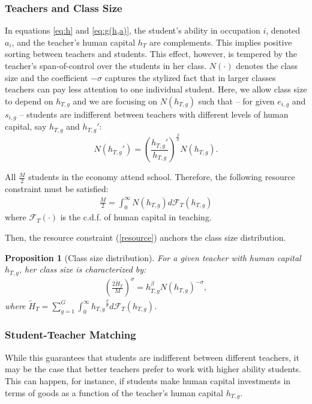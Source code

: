 \documentclass[onehalfspacing,11pt]{article}
\newtheorem{prp}{Proposition}
\begin{document}

\subsubsection{Teachers and Class Size}
In equations \eqref{eq:h} and \eqref{eq:g(h,a)}, the student's ability in occupation $i$, denoted $a_i$, and the teacher's human capital $h_T$ are complements. This implies positive sorting between teachers and students. This effect, however, is tempered by the teacher's span-of-control over the students in her class. $N(\cdot)$ denotes the class size and the coefficient $-\sigma$ captures the stylized fact that in larger classes teachers can pay less attention to one individual student. Here, we allow class size to depend on $h_{T,g}$ and we are focusing on $N(h_{T,g})$ such that -- for given $e_{i,g}$ and $s_{i,g}$ -- students are indifferent between teachers with different levels of human capital, say $h_{T,g}$ and ${h_{T,g}}'$:
 \begin{equation}
\label{ }
N({h_{T,g}}') = \left(\frac{{h_{T,g}}'}{{h_{T,g}}}\right)^{\frac{\beta}{\sigma}} N({h_{T,g}}).
\end{equation}

All $\frac{M}{2}$ students in the economy attend school. Therefore, the following resource constraint must be satisfied:
\begin{align}
\label{resource}
\frac{M}{2}=\int_0^\infty N(h_{T,g})d\mathcal{F}_T(h_{T,g}) 
\end{align}
where $\mathcal{F}_T(\cdot)$ is the c.d.f. of human capital in teaching.

Then, the resource constraint (\ref{resource}) anchors the class size distribution.
\begin{prp}[Class size distribution] For a given teacher with human capital $h_{T,g}$, her class size is characterized by:
\begin{align}
  \left(\frac{2\widetilde{H}_T}{M}\right)^\sigma=h_{T,g}^\beta N(h_{T,g})^{-\sigma},
\end{align}
where $\widetilde{H}_T = \sum_{g=1}^G \int_0^\infty {h_{T,g}}^{\frac{\beta}{\sigma}} d\mathcal{F}_T(h_{T,g}) $.
\end{prp}

\subsubsection{Student-Teacher Matching}
While this guarantees that students are indifferent between different teachers, it may be the case that better teachers prefer to work with higher ability students. This can happen, for instance, if students make human capital investments in terms of goods as a function of the teacher's human capital $h_{T,g}$. 
\end{document}
